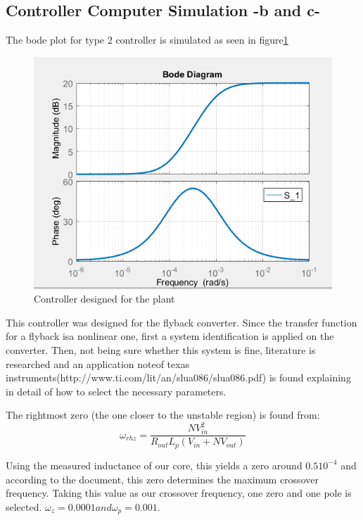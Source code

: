 \documentclass[12pt]{article}
\begin{document}
\subsection{Controller Computer Simulation -b and c-}
The bode plot for type 2 controller is simulated as seen in figure\ref{fig:controller}

\begin{figure}
    \centering
    \includegraphics{controllerd}
    \caption{Controller designed for the plant}
    \label{fig:controller}
\end{figure}

This controller was designed for the flyback converter. Since the transfer function for a flyback isa nonlinear one, first a system identification is applied on the converter. Then, not being sure whether this system is fine, literature is researched and an application noteof texas instruments(http://www.ti.com/lit/an/slua086/slua086.pdf) is found explaining in detail of how to select the necessary parameters.



The rightmost zero (the one closer to the unstable region) is found from:
\begin{equation}
    \omega_{rhz}=\dfrac{N V^2_{in}}{R_{out}L_p(V_{in} +N V_{out}) }
    \label{1}
\end{equation}

Using the measured inductance of our core, this yields a zero around $0.5 10^{-4}$ and according to the document, this zero determines the maximum crossover frequency. Taking this value as our crossover frequency, one zero and one pole is selected. $\omega_{z}=0.0001 and \omega_{p}=0.001$. 
\end{document}
